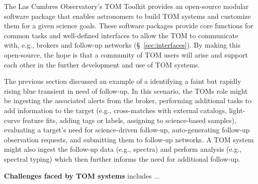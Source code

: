 The Las Cumbres Observatory's  {TOM} Toolkit \citep{2018SPIE10707E..11S} provides an open-source modular software package that enables astronomers to build  {TOM} systems and customize them for a given science goals.
These software packages provide core functions for common tasks and well-defined interfaces to allow the  {TOM} to communicate with, e.g., brokers and follow-up networks (\S~\ref{sec:interfaces}).
By making this open-source, the hope is that a community of  {TOM} users will arise and support each other in the further development and use of  {TOM} systems. 

The previous section discussed an example of a identifying a faint but rapidly rising blue  {transient} in need of follow-up.
In this scenario, the TOMs role might be ingesting the associated alerts from the broker, performing additional tasks to add information to the target (e.g., cross-matches with external catalogs, light-curve feature fits, adding tags or labels, assigning to science-based samples), evaluating a target's need for science-driven follow-up, auto-generating follow-up observation requests, and submitting them to follow-up networks.
A  {TOM} system might also ingest the follow-up data (e.g., spectra) and perform analysis (e.g., spectral typing) which then further informs the need for additional follow-up.

{\bf Challenges faced by  {TOM} systems} includes ... 

